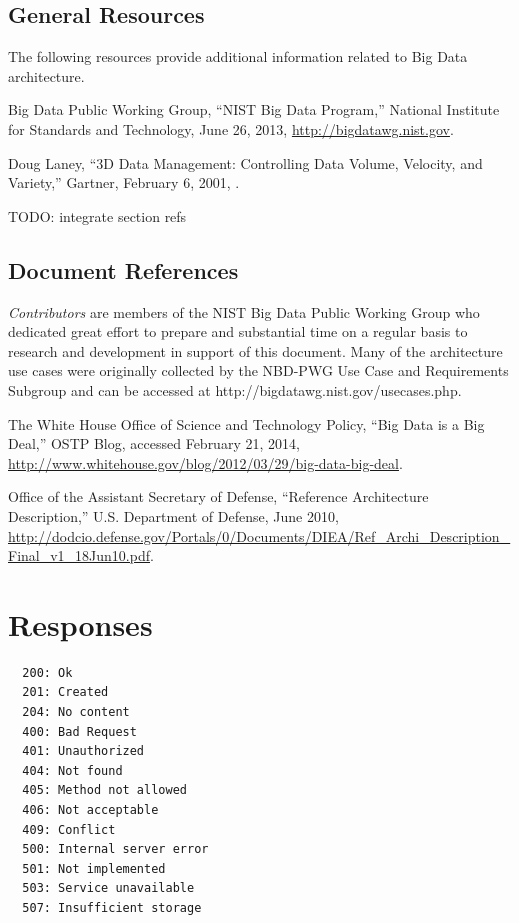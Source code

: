 \documentclass[11pt]{article}
\begin{document}
\subsection{General Resources}

The following resources provide additional information related to Big Data architecture. 

Big Data Public Working Group, “NIST Big Data Program,” National Institute for Standards and 
Technology, June 26, 2013, \url{http://bigdatawg.nist.gov}.

Doug Laney, “3D Data Management: Controlling Data Volume, Velocity, and Variety,” Gartner, February 
6, 2001, \cite{laney013ddata}.

TODO: integrate section refs

\subsection{Document References}

 {\it Contributors} are members of the NIST Big Data Public Working Group who dedicated great effort to prepare 
and substantial time on a regular basis to research and development in support of this document.
  Many of the architecture use cases were originally collected by the NBD-PWG Use Case and Requirements 
Subgroup and can be accessed at http://bigdatawg.nist.gov/usecases.php.

The White House Office of Science and Technology Policy, “Big Data is a Big Deal,” OSTP Blog, accessed 
February 21, 2014, \url{http://www.whitehouse.gov/blog/2012/03/29/big-data-big-deal}.
 
Office of the Assistant Secretary of Defense, “Reference Architecture Description,” U.S. Department of Defense, 
June 2010, \url{http://dodcio.defense.gov/Portals/0/Documents/DIEA/Ref_Archi_Description_Final_v1_18Jun10.pdf}.





\appendix

\section{Responses}

\begin{verbatim}
  200: Ok
  201: Created
  204: No content
  400: Bad Request
  401: Unauthorized
  404: Not found
  405: Method not allowed
  406: Not acceptable
  409: Conflict
  500: Internal server error
  501: Not implemented
  503: Service unavailable
  507: Insufficient storage
\end{verbatim}
\end{document}
